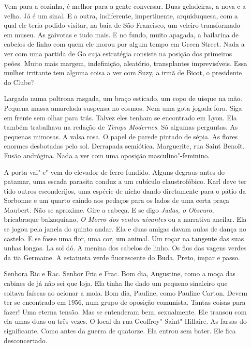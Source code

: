 Vem para a cozinha, é melhor para a gente conversar. Duas geladeiras, a
nova e a velha. Já é um sinal. E a outra, indiferente, impertinente,
arquiduquesa, com a qual ele teria podido visitar, na baia de São
Francisco, um veleiro transformado em museu. As gaivotas e tudo mais. E
no fundo, muito apagada, a bailarina de cabelos de linho com quem ele
morou por algum tempo em Green Street. Nada a ver com uma partida de Go
cuja estratégia consiste na posição dos primeiros peões. Muito mais
margem, indefinição, aleatório, transplantes imprevisíveis. Essa mulher
irritante tem alguma coisa a ver com Suzy, a irmã de Bicot, o presidente
do Clube?

Largado numa poltrona rasgada, um braço esticado, um copo de uísque na
mão. Pequena massa amarelada suspensa no cosmos. Nem uma gota jogada
fora. Siga em frente sem olhar para trás. Talvez eles tenham se
encontrado em Lyon. Ela também trabalhava na redação de \emph{Temps
Modernes}. Só algumas perguntas. As pequenas mimosas. A valsa rosa. O
papel de parede pintado de sépia. As flores enormes desbotadas pelo sol.
Derrapada semiótica. Marguerite, rua Saint Benoît. Fusão andrógina. Nada
a ver com uma oposição masculino"-feminino.

A porta vai"-e"-vem do elevador de ferro fundido. Alguns degraus antes do
patamar, uma escada parasita conduz a um cubículo claustrofóbico. Karl
deve ter tido outros esconderijos, uma espécie de nicho dando
diretamente para o pátio da Sorbonne e um quarto caindo aos pedaços para
os lados de uma certa praça Maubert. Não se aproxime. Gire a cabeça. E
se digo \emph{Judas, o Obscuro}, bricabraque balzaquiano, \emph{O Morro
dos ventos uivantes} ou a narrativa ancilar. Ela se jogou pela janela do
quinto andar. Ela e duas amigas davam aulas de dança no castelo. E se
fosse uma flor, uma cor, um animal. Um roçar na tangente das suas unhas
longas. La sol dó. A menina dos cabelos de linho. Os fios das vagens
verdes da tia Germaine. A estatueta verde fluorescente do Buda. Preto,
ímpar e passo.

Senhora Ric e Rac. Senhor Fric e Frac. Bom dia, Augustine, como a moça
das cabines de já não sei que loja. Ela tinha lhe dado um pequeno
sinaleiro que soltava faíscas ao acionar a mola. Bom dia, Pauline, como
Pauline Carton. Devem ter se encontrado em 1956, num grupo de oposição
comunista. Tantas coisas para fazer! Uma eterna tensão. Mas se
entenderam bem, sexualmente. Ele transou com ela umas duas ou três
vezes. O local da rua Geoffroy"-Saint"-Hillaire. As farsas do
significante. Como antes da guerra de quatorze. Ela entrou sem bater.
Ele fica desconcertado.

